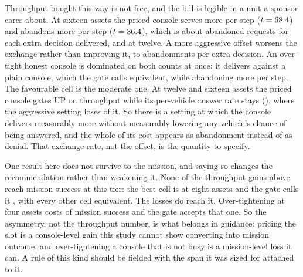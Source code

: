 \documentclass[11pt]{article}
\begin{document}
Throughput bought this way is not free, and the bill is legible in a unit a sponsor cares about.
At sixteen assets the priced console serves \CapPayServed{} more per step ($t = 68.4{}$)
and abandons \CapPayAband{} more per step ($t = 36.4{}$), which is about
\CapPayRate{} abandoned requests for each extra decision delivered, and \CapPayRateMid{} at
twelve. A more aggressive offset worsens the exchange rather than improving it, to
\CapPayRateBig{} abandonments per extra decision. An over-tight honest console is dominated on
both counts at once: it delivers \CapDomServed{} against a plain console, which the gate calls
equivalent, while abandoning \CapDomAband{} more per step. The favourable cell is the moderate
one. At twelve and sixteen assets the priced console gates UP on throughput while its per-vehicle
answer rate stays \CapPayAnswerVerdict{} (\CapPayAnswer{}), where the aggressive setting loses
\CapPayAnswerBig{} of it. So there is a setting at which the console delivers measurably more
without measurably lowering any vehicle's chance of being answered, and the whole of its cost
appears as abandonment instead of as denial. That exchange rate, not the offset, is the quantity to
specify.

One result here does not survive to the mission, and saying so changes the recommendation rather
than weakening it. None of the throughput gains above reach mission success at this tier: the best
cell is \BiMissBest{} at eight assets and the gate calls it \BiMissBestVerdict{}, with every other
cell equivalent. The losses do reach it. Over-tightening at four assets costs \BiMissHarm{} of
mission success and the gate accepts that one. So the asymmetry, not the throughput number, is what
belongs in guidance: pricing the slot is a console-level gain this study cannot show converting into
mission outcome, and over-tightening a console that is not busy is a mission-level loss it can. A
rule of this kind should be fielded with the span it was sized for attached to it.
\end{document}
